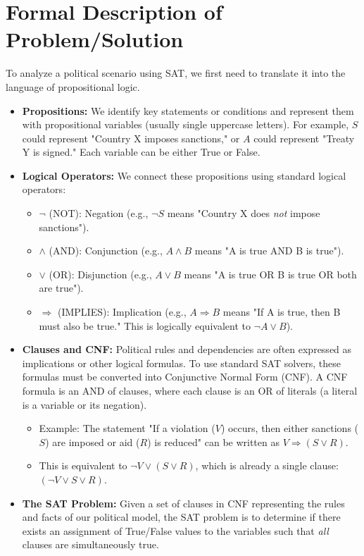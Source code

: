 \documentclass[11pt, a4paper]{article}
\begin{document}
\section{Formal Description of Problem/Solution} \label{sec:formal}

To analyze a political scenario using SAT, we first need to translate it into the language of propositional logic.
\begin{itemize}
    \item \textbf{Propositions:} We identify key statements or conditions and represent them with propositional variables (usually single uppercase letters). For example, $S$ could represent "Country X imposes sanctions," or $A$ could represent "Treaty Y is signed." Each variable can be either True or False.
    \item \textbf{Logical Operators:} We connect these propositions using standard logical operators:
    \begin{itemize}
        \item $\neg$ (NOT): Negation (e.g., $\neg S$ means "Country X does \textit{not} impose sanctions").
        \item $\wedge$ (AND): Conjunction (e.g., $A \wedge B$ means "A is true AND B is true").
        \item $\vee$ (OR): Disjunction (e.g., $A \vee B$ means "A is true OR B is true OR both are true").
        \item $\Rightarrow$ (IMPLIES): Implication (e.g., $A \Rightarrow B$ means "If A is true, then B must also be true." This is logically equivalent to $\neg A \vee B$).
    \end{itemize}
    \item \textbf{Clauses and CNF:} Political rules and dependencies are often expressed as implications or other logical formulas. To use standard SAT solvers, these formulas must be converted into Conjunctive Normal Form (CNF). A CNF formula is an AND of clauses, where each clause is an OR of literals (a literal is a variable or its negation).
    \begin{itemize}
            \item Example: The statement "If a violation ($V$) occurs, then either sanctions ($S$) are imposed or aid ($R$) is reduced" can be written as $V \Rightarrow (S \vee R)$.
            \item This is equivalent to $\neg V \vee (S \vee R)$, which is already a single clause: $(\neg V \vee S \vee R)$.
    \end{itemize}
    \item \textbf{The SAT Problem:} Given a set of clauses in CNF representing the rules and facts of our political model, the SAT problem is to determine if there exists an assignment of True/False values to the variables such that \textit{all} clauses are simultaneously true.

\end{itemize}
\end{document}

